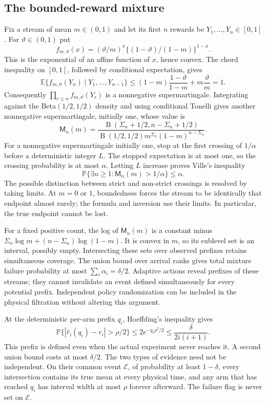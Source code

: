 \documentclass[11pt]{article}
\theoremstyle{remark}
\newcommand{\E}{\mathbb E}
\newcommand{\Prob}{\mathbb P}
\begin{document}
\subsection{The bounded-reward mixture}
Fix a stream of mean $m\in(0,1)$ and let its first $n$ rewards be
$Y_1,\ldots,Y_n\in[0,1]$. For $\vartheta\in(0,1)$ put
\[
 f_{m,\vartheta}(x)=
 (\vartheta/m)^x\{(1-\vartheta)/(1-m)\}^{1-x}.
\]
This is the exponential of an affine function of $x$, hence convex.
The chord inequality on $[0,1]$, followed by conditional expectation,
gives
\[
 \E\{f_{m,\vartheta}(Y_n)\mid Y_1,\ldots,Y_{n-1}\}
 \le(1-m)\frac{1-\vartheta}{1-m}
       +m\frac{\vartheta}{m}=1.
\]
Consequently $\prod_{r\le n}f_{m,\vartheta}(Y_r)$ is a nonnegative
supermartingale. Integrating against the Beta$(1/2,1/2)$ density and
using conditional Tonelli gives another nonnegative supermartingale,
initially one, whose value is
\[
 \mathsf M_n(m)=
 \frac{\operatorname B(\Sigma_n+1/2,n-\Sigma_n+1/2)}
 {\operatorname B(1/2,1/2)m^{\Sigma_n}(1-m)^{n-\Sigma_n}}.
\]
For a nonnegative supermartingale initially one, stop at the first
crossing of $1/\alpha$ before a deterministic integer $L$. The stopped
expectation is at most one, so the crossing probability is at most
$\alpha$. Letting $L$ increase proves Ville's inequality
\[
 \Prob\{\exists n\ge1:\mathsf M_n(m)>1/\alpha\}\le\alpha.
\]
The possible distinction between strict and non-strict crossings is
resolved by taking limits. At $m=0$ or $1$, boundedness forces the stream
to be identically that endpoint almost surely; the formula and inversion
use their limits. In particular, the true endpoint cannot be lost.

For a fixed positive count, the log of $\mathsf M_n(m)$ is a constant
minus $\Sigma_n\log m+(n-\Sigma_n)\log(1-m)$. It is convex in $m$,
so its sublevel set is an interval, possibly empty. Intersecting these
sets over observed prefixes retains simultaneous coverage. The union
bound over arrival ranks gives total mixture failure probability at
most $\sum_i\alpha_i=\delta/2$. Adaptive actions reveal prefixes of
these streams; they cannot invalidate an event defined simultaneously
for every potential prefix. Independent policy randomization can be
included in the physical filtration without altering this argument.

At the deterministic per-arm prefix $q_i$, Hoeffding's inequality gives
\[
 \Prob\{|\hat r_i(q_i)-r_i|>\rho/2\}
 \le2e^{-q_i\rho^2/2}\le\frac{\delta}{2i(i+1)}.
\]
This prefix is defined even when the actual experiment never reaches it.
A second union bound costs at most $\delta/2$. The two types of evidence
need not be independent. On their common event $\mathcal E$, of
probability at least $1-\delta$, every intersection contains its true
mean at every physical time, and any arm that has reached $q_i$ has
interval width at most $\rho$ forever afterward. The failure flag is
never set on $\mathcal E$.
\end{document}
